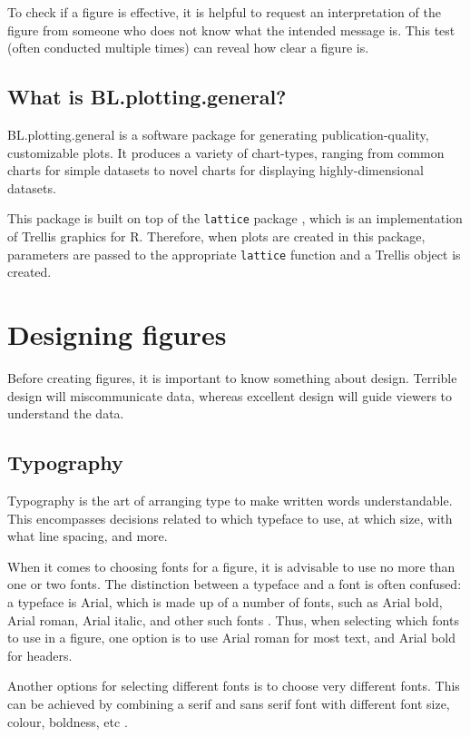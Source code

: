 \documentclass[letterpaper]{article}\usepackage[]{graphicx}\usepackage[]{color}
\begin{document}
To check if a figure is effective, it is helpful to request an interpretation of the figure from someone who does not know what the intended message is. This test (often conducted multiple times) can reveal how clear a figure is.

\subsection{What is BL.plotting.general?}
BL.plotting.general is a software package for generating publication-quality, customizable plots. It produces a variety of chart-types, ranging from common charts for simple datasets to novel charts for displaying highly-dimensional datasets.

This package is built on top of the \texttt{lattice} package \cite{lattice}, which is an implementation of Trellis graphics for R. Therefore, when plots are created in this package, parameters are passed to the appropriate \texttt{lattice} function and a Trellis object is created. 

\section{Designing figures}
Before creating figures, it is important to know something about design. Terrible design will miscommunicate data, whereas excellent design will guide viewers to understand the data\cite{tufte}. 

\subsection{Typography}
Typography is the art of arranging type to make written words understandable. This encompasses decisions related to which typeface to use, at which size, with what line spacing, and more. 

When it comes to choosing fonts for a figure, it is advisable to use no more than one or two fonts. The distinction between a typeface and a font is often confused: a typeface is Arial, which is made up of a number of fonts, such as Arial bold, Arial roman, Arial italic, and other such fonts \cite{wong-type}. Thus, when selecting which fonts to use in a figure, one option is to use Arial roman for most text, and Arial bold for headers.

Another options for selecting different fonts is to choose very different fonts. This can be achieved by combining a serif and sans serif font with different font size, colour, boldness, etc \cite{williams}.
\end{document}
